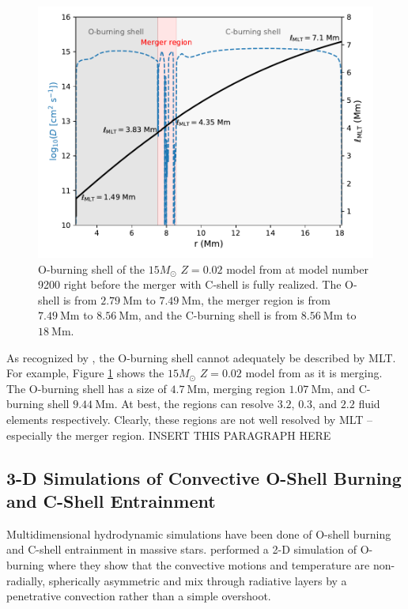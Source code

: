 \begin{figure}[!htbp]
\includegraphics[width=\textwidth]{chapters/1/figures/Oshell_ell_MLT.pdf}
\caption{O-burning shell of the $15 M_\odot$ $Z=0.02$ model from \cite{ritterNuGridStellarData2018} at model number 9200 right before the merger with C-shell is fully realized. The O-shell is from $2.79~\mathrm{Mm}$ to $7.49~\mathrm{Mm}$, the merger region is from $7.49~\mathrm{Mm}$ to $8.56~\mathrm{Mm}$, and the C-burning shell is from $8.56~\mathrm{Mm}$ to $18~\mathrm{Mm}$.
\label{fig:Oshell_ell_MLT}}
\end{figure}

As recognized by \cite{bazanConvectionNucleosynthesisCore1994}, the O-burning shell cannot adequately be described by MLT.
For example, Figure \ref{fig:Oshell_ell_MLT} shows the $15 M_\odot$ $Z=0.02$ model from \cite{ritterNuGridStellarData2018} as it is merging.
The O-burning shell has a size of $4.7~\mathrm{Mm}$, merging region $1.07~\mathrm{Mm}$, and C-burning shell $9.44~\mathrm{Mm}$.
At best, the regions can resolve $3.2$, $0.3$, and $2.2$ fluid elements respectively.
Clearly, these regions are not well resolved by MLT -- especially the merger region.
INSERT THIS PARAGRAPH HERE

\subsection{3-D Simulations of Convective O-Shell Burning and C-Shell Entrainment}

Multidimensional hydrodynamic simulations have been done of O-shell burning and C-shell entrainment in massive stars.
\cite{bazanConvectionNucleosynthesisCore1994} performed a 2-D simulation of O-burning where they show that the convective motions and temperature are non-radially, spherically asymmetric and mix through radiative layers by a penetrative convection rather than a simple overshoot.

